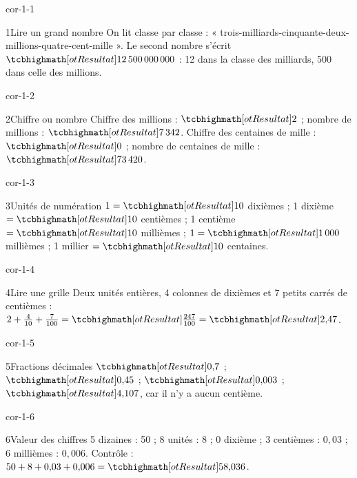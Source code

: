 \clearpage\pagestyle{otMain}\setlength{\otBlocEspacement}{2.5mm}\fontsize{11}{15}\selectfont{}
\begin{blocLivre}{cor-1-1}\begin{corrige}{1}{Lire un grand nombre}
On lit classe par classe : « trois-milliards-cinquante-deux-millions-quatre-cent-mille ». Le second nombre s’écrit $\res{12\,500\,000\,000}$ : 12 dans la classe des milliards, 500 dans celle des millions.
\end{corrige}\end{blocLivre}
\begin{blocLivre}{cor-1-2}\begin{corrige}{2}{Chiffre ou nombre}
Chiffre des millions : $\res2$ ; nombre de millions : $\res{7\,342}$. Chiffre des centaines de mille : $\res0$ ; nombre de centaines de mille : $\res{73\,420}$.
\end{corrige}\end{blocLivre}
\begin{blocLivre}{cor-1-3}\begin{corrige}{3}{Unités de numération}
$1=\res{10}$ dixièmes ; 1 dixième $=\res{10}$ centièmes ; 1 centième $=\res{10}$ millièmes ; $1=\res{1\,000}$ millièmes ; 1 millier $=\res{10}$ centaines.
\end{corrige}\end{blocLivre}
\begin{blocLivre}{cor-1-4}\begin{corrige}{4}{Lire une grille}
Deux unités entières, 4 colonnes de dixièmes et 7 petits carrés de centièmes : $2+\frac4{10}+\frac7{100}=\res{\frac{247}{100}}=\res{2{,}47}$.
\label{fig-cor-1-4}
\end{corrige}\end{blocLivre}
\begin{blocLivre}{cor-1-5}\begin{corrige}{5}{Fractions décimales}
$\res{0{,}7}$ ; $\res{0{,}45}$ ; $\res{0{,}003}$ ; $\res{4{,}107}$, car il n’y a aucun centième.
\end{corrige}\end{blocLivre}
\begin{blocLivre}{cor-1-6}\begin{corrige}{6}{Valeur des chiffres}
5 dizaines : 50 ; 8 unités : 8 ; 0 dixième ; 3 centièmes : $0{,}03$ ; 6 millièmes : $0{,}006$. Contrôle : $50+8+0{,}03+0{,}006=\res{58{,}036}$.
\end{corrige}\end{blocLivre}
